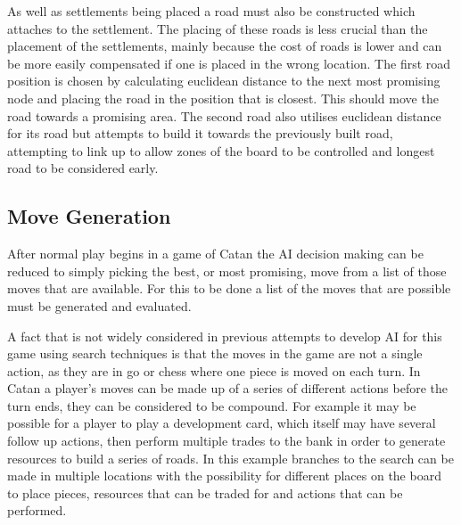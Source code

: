 \documentclass[]{article}
\begin{document}
\par As well as settlements being placed a road must also be constructed which attaches to the settlement. The placing of these roads is less crucial than the placement of the settlements, mainly because the cost of roads is lower and can be more easily compensated if one is placed in the wrong location. The first road position is chosen by calculating euclidean distance to the next most promising node and placing the road in the position that is closest. This should move the road towards a promising area. The second road also utilises euclidean distance for its road but attempts to build it towards the previously built road, attempting to link up to allow zones of the board to be controlled and longest road to be considered early.



\subsection{Move Generation}

After normal play begins in a game of Catan the AI decision making can be reduced to simply picking the best, or most promising, move from a list of those moves that are available. For this to be done a list of the moves that are possible must be generated and evaluated.

\par A fact that is not widely considered in previous attempts to develop AI for this game using search techniques is that the moves in the game are not a single action, as they are in go or chess where one piece is moved on each turn. In Catan a player's moves can be made up of a series of different actions before the turn ends, they can be considered to be compound. For example it may be possible for a player to play a development card, which itself may have several follow up actions, then perform multiple trades to the bank in order to generate resources to build a series of roads. In this example branches to the search can be made in multiple locations with the possibility for different places on the board to place pieces, resources that can be traded for and actions that can be performed.
\end{document}
